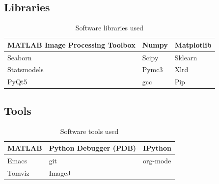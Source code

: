 \documentclass[11pt]{report}
\begin{document}
\subsection{Libraries}
\label{sec:orgcd2859c}
\begin{table}[htbp]
\caption{\label{tab:orgd84b275}
Software libraries used}
\centering
\begin{tabularx}{\textwidth}{|X|X|X|}
\hline
MATLAB Image Processing Toolbox & Numpy & Matplotlib\\
\hline
Seaborn & Scipy & Sklearn\\
\hline
Statsmodels & Pymc3 & Xlrd\\
\hline
PyQt5 & gcc & Pip\\
\hline
\end{tabularx}
\end{table}

\subsection{Tools}
\label{sec:orgb80eece}
\begin{table}[htbp]
\caption{\label{tab:org7ff1320}
Software tools used}
\centering
\begin{tabularx}{\textwidth}{|X|X|X|}
\hline
MATLAB & Python Debugger (PDB) & IPython\\
\hline
Emacs & git & org-mode\\
\hline
Tomviz & ImageJ & \\
\hline
\end{tabularx}
\end{table}
\end{document}
